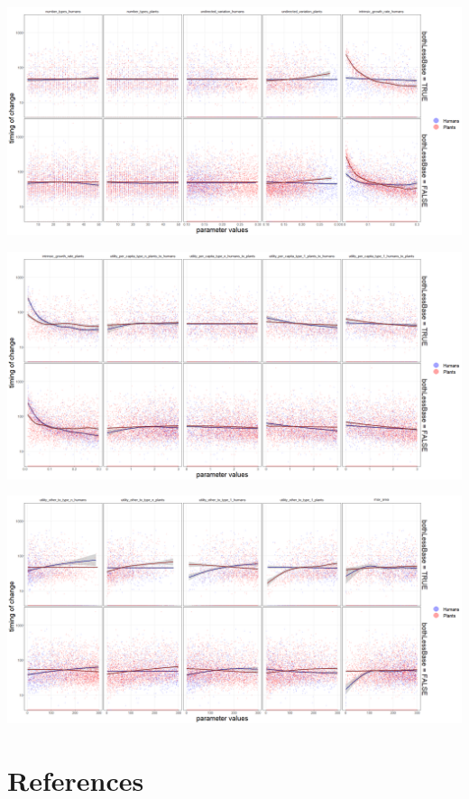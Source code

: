 \documentclass[
]{book}
\begin{document}
\includegraphics[width=1\linewidth]{plots/5_LHS_bothLessBase_timing_bifurcationPlot_twoVariables_per_parameter_and_scenario_part1}

\includegraphics[width=1\linewidth]{plots/5_LHS_bothLessBase_timing_bifurcationPlot_twoVariables_per_parameter_and_scenario_part2}

\includegraphics[width=1\linewidth]{plots/5_LHS_bothLessBase_timing_bifurcationPlot_twoVariables_per_parameter_and_scenario_part3}

\hypertarget{references}{%
\chapter{References}\label{references}}
\end{document}
